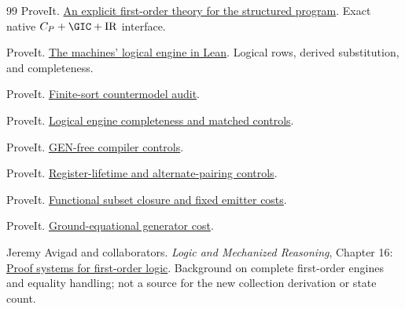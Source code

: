 \begin{thebibliography}{99}
ProveIt.
\href{https://github.com/VladimirReshetnikov/ProveIt/blob/ce192939372ac7944fe2a0208c68a96d49fb5e3b/Computability/BusyBeaver/Research/ZFC/native_theory254.md}{An explicit first-order theory for the structured program}.
Exact native $C_P+\GIC+\mathrm{IR}$ interface.

ProveIt.
\href{https://github.com/VladimirReshetnikov/ProveIt/blob/ce192939372ac7944fe2a0208c68a96d49fb5e3b/Computability/BusyBeaver/Research/ZFC/tarski_logic_layer.md}{The machines' logical engine in Lean}.
Logical rows, derived substitution, and completeness.

ProveIt.
\href{https://github.com/VladimirReshetnikov/ProveIt/blob/ce192939372ac7944fe2a0208c68a96d49fb5e3b/Computability/BusyBeaver/Research/ZFC/typed_countermodel.md}{Finite-sort countermodel audit}.

ProveIt.
\href{https://github.com/VladimirReshetnikov/ProveIt/blob/ce192939372ac7944fe2a0208c68a96d49fb5e3b/Computability/BusyBeaver/Research/ZFC/logical_engine_completeness.md}{Logical engine completeness and matched controls}.

ProveIt.
\href{https://github.com/VladimirReshetnikov/ProveIt/blob/ce192939372ac7944fe2a0208c68a96d49fb5e3b/Computability/BusyBeaver/Research/ZFC/gen_free.md}{GEN-free compiler controls}.

ProveIt.
\href{https://github.com/VladimirReshetnikov/ProveIt/blob/ce192939372ac7944fe2a0208c68a96d49fb5e3b/Computability/BusyBeaver/Research/ZFC/register_lifetime.md}{Register-lifetime and alternate-pairing controls}.

ProveIt.
\href{https://github.com/VladimirReshetnikov/ProveIt/blob/ce192939372ac7944fe2a0208c68a96d49fb5e3b/Computability/BusyBeaver/Research/ZFC/functional_subset_closure.md}{Functional subset closure and fixed emitter costs}.

ProveIt.
\href{https://github.com/VladimirReshetnikov/ProveIt/blob/ce192939372ac7944fe2a0208c68a96d49fb5e3b/Computability/BusyBeaver/Research/ZFC/equational_generator_cost.md}{Ground-equational generator cost}.

Jeremy Avigad and collaborators.
\emph{Logic and Mechanized Reasoning}, Chapter 16:
\href{https://avigad.github.io/lamr/proof_systems_for_first_order_logic.html}{Proof systems for first-order logic}.
Background on complete first-order engines and equality handling;
not a source for the new collection derivation or state count.
\end{thebibliography}
